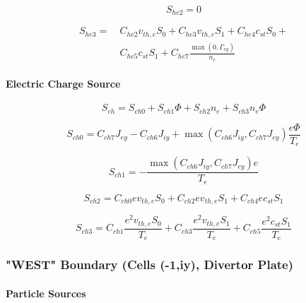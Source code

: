 \documentclass[a4paper,10pt]{report}
\begin{document}
\begin{equation}
S_{he2}=0   \label{60}
\end{equation}

\begin{equation}\begin{split}
S_{he3}= ~ &C_{he2}v_{th,e}S_{0}+C_{he3}v_{th,e}S_{1}+C_{he4}c_{st}S_{0}+ \\
~ & C_{he5}c_{st}S_{1}+C_{he7}\frac{\max\left( 0,\Gamma_{ey}\right) }{n_{e}}   \label{61}
\end{split}\end{equation}

\paragraph{Electric Charge Source}

\begin{equation}
S_{ch}=S_{ch0}+S_{ch1}\Phi+S_{ch2}n_{e}+S_{ch3}n_{e}\Phi   \label{62}
\end{equation}

\begin{equation}
S_{ch0}=C_{ch7}J_{ey}-C_{ch6}J_{iy}+
\max\left(C_{ch6}J_{iy},C_{ch7}J_{ey}\right) \frac{e\Phi}{T_{e}}   \label{63}
\end{equation}
\bigskip

\begin{equation}
S_{ch1}=-\frac{\max\left( C_{ch6}J_{iy},C_{ch7}J_{ey}\right) e}{T_{e}}   \label{64}
\end{equation}

\begin{equation}
S_{ch2}=C_{ch0}ev_{th,e}S_{0}+C_{ch2}ev_{th,e}S_{1}+C_{ch4}ec_{st}S_{1}   \label{65}
\end{equation}

\begin{equation}
S_{ch3}=C_{ch1}\frac{e^{2}v_{th,e}S_{0}}{T_{e}}+C_{ch3}
\frac{e^{2}v_{th,e}S_{1}}{T_{e}}+C_{ch5}\frac{e^{2}c_{st}S_{1}}{T_{e}}   \label{66}
\end{equation}

\subsubsection{"WEST" Boundary (Cells (-1,iy), Divertor Plate)}

\paragraph{Particle Sources}
\end{document}
